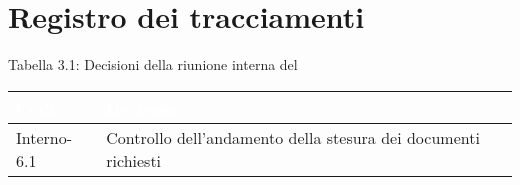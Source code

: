 \section{Registro dei tracciamenti}
{
Tabella 3.1: Decisioni della riunione interna del \Data{}
\renewcommand{\arraystretch}{1.5}
\centering
\begin{longtable}{C{3cm} C{9cm}}
\textcolor{white}{\textbf{Codice}}&
\textcolor{white}{\textbf{Decisione}}\\	
\endhead
		
Interno-6.1 & Controllo dell'andamento della stesura dei documenti richiesti\\
		
\end{longtable}
}

